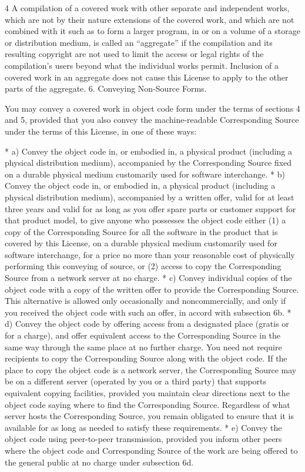 \documentclass[fontsize=11pt,paper=A4,BCOR=12mm,DIV=13,open=any,listof=totoc,toc=flat]{scrbook}
\begin{document}
{\begin{multicols}{4}
A compilation of a covered work with other separate and independent works, which are not by their nature extensions of the covered work, and which are not combined with it such as to form a larger program, in or on a volume of a storage or distribution medium, is called an “aggregate” if the compilation and its resulting copyright are not used to limit the access or legal rights of the compilation's users beyond what the individual works permit. Inclusion of a covered work in an aggregate does not cause this License to apply to the other parts of the aggregate.
6. Conveying Non-Source Forms.

You may convey a covered work in object code form under the terms of sections 4 and 5, provided that you also convey the machine-readable Corresponding Source under the terms of this License, in one of these ways:

    * a) Convey the object code in, or embodied in, a physical product (including a physical distribution medium), accompanied by the Corresponding Source fixed on a durable physical medium customarily used for software interchange.
    * b) Convey the object code in, or embodied in, a physical product (including a physical distribution medium), accompanied by a written offer, valid for at least three years and valid for as long as you offer spare parts or customer support for that product model, to give anyone who possesses the object code either (1) a copy of the Corresponding Source for all the software in the product that is covered by this License, on a durable physical medium customarily used for software interchange, for a price no more than your reasonable cost of physically performing this conveying of source, or (2) access to copy the Corresponding Source from a network server at no charge.
    * c) Convey individual copies of the object code with a copy of the written offer to provide the Corresponding Source. This alternative is allowed only occasionally and noncommercially, and only if you received the object code with such an offer, in accord with subsection 6b.
    * d) Convey the object code by offering access from a designated place (gratis or for a charge), and offer equivalent access to the Corresponding Source in the same way through the same place at no further charge. You need not require recipients to copy the Corresponding Source along with the object code. If the place to copy the object code is a network server, the Corresponding Source may be on a different server (operated by you or a third party) that supports equivalent copying facilities, provided you maintain clear directions next to the object code saying where to find the Corresponding Source. Regardless of what server hosts the Corresponding Source, you remain obligated to ensure that it is available for as long as needed to satisfy these requirements.
    * e) Convey the object code using peer-to-peer transmission, provided you inform other peers where the object code and Corresponding Source of the work are being offered to the general public at no charge under subsection 6d.


\end{multicols}}
\end{document}
